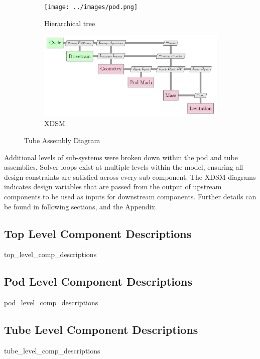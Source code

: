 \begin{figure}
\centering
\begin{subfigure}[t]{.5\textwidth}
  \centering
  \texttt{[image: ../images/pod.png]}
  \caption{Hierarchical tree}
  \label{fig:tree:pod}
\end{subfigure}%
\begin{subfigure}[t]{.5\textwidth}
  \centering
  \includegraphics{../images/xdsm/pod.pdf}
  \caption{XDSM}
  \label{fig:xdsm:pod}
\end{subfigure}
\caption{Tube Assembly Diagram}
\label{fig:pod}
\end{figure}

Additional levels of sub-systems were broken down within the pod and tube assemblies.
Solver loops exist at multiple levels within the model, ensuring all design
constraints are satisfied across every sub-component.
The XDSM diagrams indicates design variables that are passed from the output of
upstream components to be used as inputs for downstream components.
Further details can be found in following sections, and the Appendix.

\subsection{Top Level Component Descriptions}
	{top_level_comp_descriptions}
\subsection{Pod Level Component Descriptions}
	{pod_level_comp_descriptions}
\subsection{Tube Level Component Descriptions}
	{tube_level_comp_descriptions}


